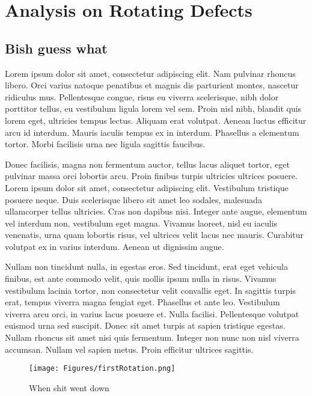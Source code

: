 \chapter{Analysis on Rotating Defects}
\label{ch:rotdefect}


\section{Bish guess what}

Lorem ipsum dolor sit amet, consectetur adipiscing elit. Nam pulvinar rhoncus libero. Orci varius natoque penatibus et magnis dis parturient montes, nascetur ridiculus mus. Pellentesque congue, risus eu viverra scelerisque, nibh dolor porttitor tellus, eu vestibulum ligula lorem vel sem. Proin nisl nibh, blandit quis lorem eget, ultricies tempus lectus. Aliquam erat volutpat. Aenean luctus efficitur arcu id interdum. Mauris iaculis tempus ex in interdum. Phasellus a elementum tortor. Morbi facilisis urna nec ligula sagittis faucibus.

Donec facilisis, magna non fermentum auctor, tellus lacus aliquet tortor, eget pulvinar massa orci lobortis arcu. Proin finibus turpis ultricies ultrices posuere. Lorem ipsum dolor sit amet, consectetur adipiscing elit. Vestibulum tristique posuere neque. Duis scelerisque libero sit amet leo sodales, malesuada ullamcorper tellus ultricies. Cras non dapibus nisi. Integer ante augue, elementum vel interdum non, vestibulum eget magna. Vivamus laoreet, nisl eu iaculis venenatis, urna quam lobortis risus, vel ultrices velit lacus nec mauris. Curabitur volutpat ex in varius interdum. Aenean ut dignissim augue.

Nullam non tincidunt nulla, in egestas eros. Sed tincidunt, erat eget vehicula finibus, est ante commodo velit, quis mollis ipsum nulla in risus. Vivamus vestibulum lacinia tortor, non consectetur velit convallis eget. In sagittis turpis erat, tempus viverra magna feugiat eget. Phasellus et ante leo. Vestibulum viverra arcu orci, in varius lacus posuere et. Nulla facilisi. Pellentesque volutpat euismod urna sed suscipit. Donec sit amet turpis at sapien tristique egestas. Nullam rhoncus sit amet nisi quis fermentum. Integer non nunc non nisl viverra accumsan. Nullam vel sapien metus. Proin efficitur ultrices sagittis.

    \begin{figure}
        \centering
        \texttt{[image: Figures/firstRotation.png]}
        \caption{When shit went down}
        \label{fig:stm}
    \end{figure}

